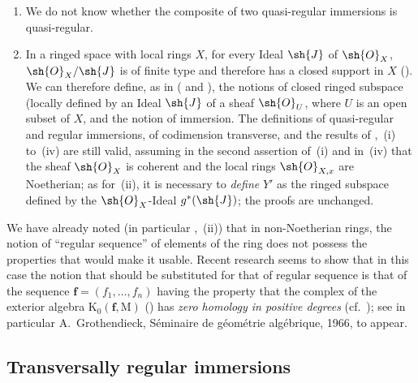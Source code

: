 \begin{remarks}[19.1.7]
\label{IV.19.1.7}
\medskip\noindent
\begin{enumerate}[label=(\roman*)]
  \item We do not know whether the composite of two quasi-regular immersions is quasi-regular.
  \item In a ringed space with local rings $X$, for every Ideal $\sh{J}$ of $\sh{O}_X$, $\sh{O}_X/\sh{J}$ is of finite type and therefore has a closed support in $X$ ().
We can therefore define, as in ( and ), the notions of closed ringed subspace (locally defined by an Ideal $\sh{J}$ of a sheaf $\sh{O}_U$, where $U$ is an open subset of $X$, and the notion of immersion.
The definitions of quasi-regular and regular immersions, of codimension transverse, and the results of ,~(i) to~(iv) are still valid, assuming in the second assertion of~(i) and in~(iv) that the sheaf $\sh{O}_X$ is coherent and the local rings $\sh{O}_{X,x}$ are Noetherian; as for~(ii), it is necessary to \emph{define} $Y'$ as the ringed subspace defined by the $\sh{O}_X$-Ideal $g^*(\sh{J})$; the proofs are unchanged.
\end{enumerate}
\end{remarks}

\begin{env}[19.1.8]
\label{IV.19.1.8}
We have already noted (in particular ,~(ii)) that in non-Noetherian rings, the notion of ``regular sequence'' of elements of the ring does not possess the properties that would make it usable.
Recent research seems to show that in this case the notion that should be substituted for that of regular sequence is that of the sequence $\mathbf{f}=(f_1,\ldots,f_n)$ having the property that the complex of the exterior algebra $\mathrm{K}_0(\mathbf{f},\mathrm{M})$ () has \emph{zero homology in positive degrees} (cf.\ ); see in particular A.~Grothendieck, S\'eminaire de g\'eom\'etrie alg\'ebrique, 1966, to appear.
\end{env}

\subsection{Transversally regular immersions}
\label{subsection:IV.19.2}


